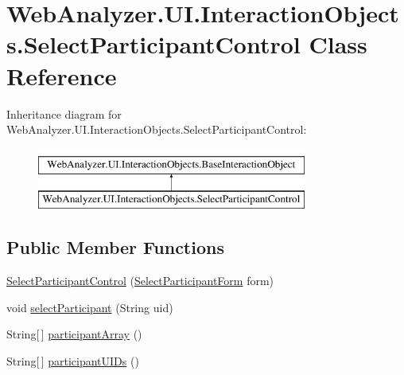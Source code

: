 \hypertarget{class_web_analyzer_1_1_u_i_1_1_interaction_objects_1_1_select_participant_control}{}\section{Web\+Analyzer.\+U\+I.\+Interaction\+Objects.\+Select\+Participant\+Control Class Reference}
\label{class_web_analyzer_1_1_u_i_1_1_interaction_objects_1_1_select_participant_control}
Inheritance diagram for Web\+Analyzer.\+U\+I.\+Interaction\+Objects.\+Select\+Participant\+Control\+:\begin{figure}[H]
\begin{center}
\leavevmode
\includegraphics[height=2.000000cm]{class_web_analyzer_1_1_u_i_1_1_interaction_objects_1_1_select_participant_control}
\end{center}
\end{figure}
\subsection*{Public Member Functions}
\begin{DoxyCompactItemize}
\item 
\hyperlink{class_web_analyzer_1_1_u_i_1_1_interaction_objects_1_1_select_participant_control_a5e32876cf2be99557c7c68d2e127448e}{Select\+Participant\+Control} (\hyperlink{class_web_analyzer_1_1_u_i_1_1_select_participant_form}{Select\+Participant\+Form} form)
\item 
void \hyperlink{class_web_analyzer_1_1_u_i_1_1_interaction_objects_1_1_select_participant_control_a770eee3d5aa9ed696bf44e252b733892}{select\+Participant} (String uid)
\item 
String\mbox{[}$\,$\mbox{]} \hyperlink{class_web_analyzer_1_1_u_i_1_1_interaction_objects_1_1_select_participant_control_a470db28a84372495c8e93d4820836f67}{participant\+Array} ()
\item 
String\mbox{[}$\,$\mbox{]} \hyperlink{class_web_analyzer_1_1_u_i_1_1_interaction_objects_1_1_select_participant_control_a4092c226a33e62a4c94c480f3446f41d}{participant\+U\+I\+Ds} ()
\end{DoxyCompactItemize}
